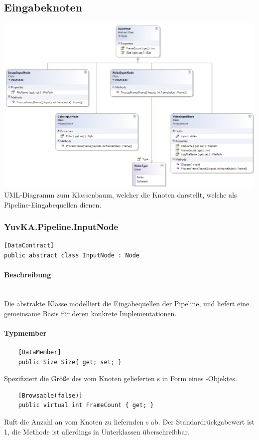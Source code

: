 \subsection{Eingabeknoten}

\includegraphics[width=\textwidth]{YuvKA.Pipeline/inputnodes.png}
UML-Diagramm zum Klassenbaum, welcher die Knoten darstellt, welche als Pipeline-Eingabequellen dienen.

\subsubsection{YuvKA.Pipeline.InputNode}

\begin{verbatim}
[DataContract]
public abstract class InputNode : Node
\end{verbatim}

\paragraph{Beschreibung}~\\
Die abstrakte Klasse  modelliert die Eingabequellen der Pipeline, und liefert eine gemeinsame Basis für deren konkrete Implementationen.

\paragraph{Typmember}
\begin{itemize}

	\begin{verbatim}
	[DataMember]
	public Size Size{ get; set; }
	\end{verbatim}
	Spezifiziert die Größe des vom Knoten gelieferten s in Form eines -Objektes.

	\begin{verbatim}
	[Browsable(false)]
	public virtual int FrameCount { get; }
	\end{verbatim}
	Ruft die Anzahl an vom Knoten zu liefernden s ab. Der Standardrückgabewert ist 1, die Methode ist allerdings in Unterklassen überschreibbar.

\end{itemize}

